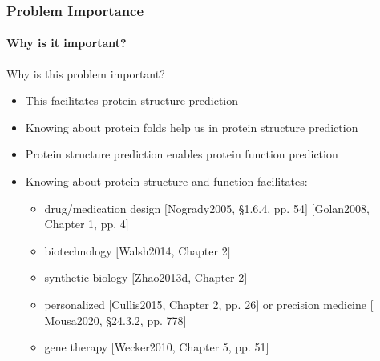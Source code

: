 \documentclass[xcolor={usenames,dvipsnames},hyperref={hyperindex,bookmarks}]{beamer}
\begin{document}
\frame
{
	\frametitle{Problem Importance}
	\framesubtitle{Why is it important?}


	Why is this problem important?
	\begin{itemize}
	\item This facilitates protein structure prediction
	\item Knowing about protein folds help us in protein structure prediction
	\item Protein structure prediction enables protein function prediction
	\item Knowing about protein structure and function facilitates:
			\begin{itemize}
			\item drug/medication design $[$Nogrady2005, \S1.6.4, pp. 54$]$ $[$Golan2008, Chapter 1, pp. 4$]$
			\item biotechnology $[$Walsh2014, Chapter 2$]$
			\item synthetic biology $[$Zhao2013d, Chapter 2$]$
			\item personalized $[$Cullis2015, Chapter 2, pp. 26$]$ or precision medicine $[$Mousa2020, \S24.3.2, pp. 778$]$
			\item gene therapy $[$Wecker2010, Chapter 5, pp. 51$]$
			\end{itemize}
	\end{itemize}
}






\end{document}
